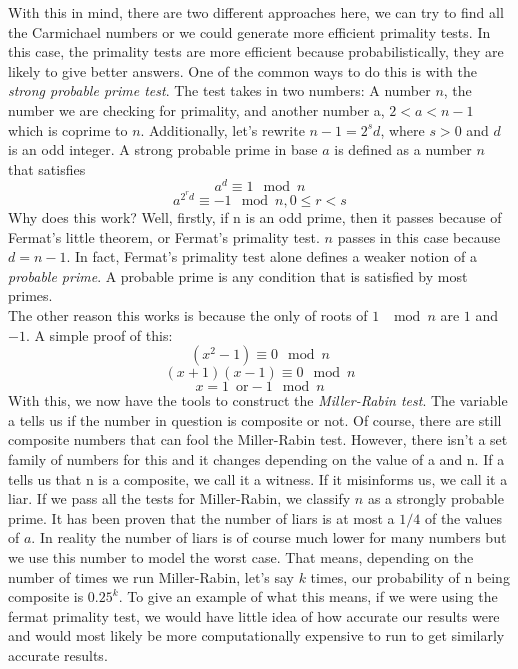 \documentclass[conference]{IEEEtran}
\begin{document}
With this in mind, there are two different approaches here, we can try to find all the Carmichael numbers or we could generate more efficient primality tests. In this case, the primality tests are more efficient because probabilistically, they are likely to give better answers. One of the common ways to do this is with the \textit{strong probable prime test}. The test takes in two numbers: A number $n$, the number we are checking for primality, and another number a, $2 < a < n - 1$ which is coprime to $n$. Additionally, let's rewrite $n - 1 = 2^s d$, where $s > 0$ and $d$ is an odd integer. A strong probable prime in base $a$ is defined as a number $n$ that satisfies 
\[
    a^d \equiv 1 \mod n
\]
\[
    a^{2^r d} \equiv -1 \mod n, 0 \leq r < s 
\]
Why does this work? Well, firstly, if n is an odd prime, then it passes because of Fermat's little theorem, or Fermat's primality test. $n$ passes in this case because $d = n - 1$. In fact, Fermat's primality test alone defines a weaker notion of a \textit{probable prime}. A probable prime is any condition that is satisfied by most primes. \\
The other reason this works is because the only of roots of $1$ $\mod n$ are $1$ and $-1$. A simple proof of this:
\[
    (x^2 - 1) \equiv 0 \mod n
\]
\[
    (x + 1)(x - 1) \equiv 0 \mod n
\]
\[
    x = 1\,\,\, \text{or} -1 \mod n
\]
With this, we now have the tools to construct the \textit{Miller-Rabin test}. The variable a tells us if the number in question is composite or not. Of course, there are still composite numbers that can fool the Miller-Rabin test. However, there isn't a set family of numbers for this and it changes depending on the value of a and n. If a tells us that n is a composite, we call it a witness. If it misinforms us, we call it a liar. If we pass all the tests for Miller-Rabin, we classify $n$ as a strongly probable prime. It has been proven that the number of liars is at most a \href{https://doi.org/10.1016%2F0022-314X%2880%2990084-0}{$1/4$} of the values of $a$. In reality the number of liars is of course much lower for many numbers but we use this number to model the worst case. That means, depending on the number of times we run Miller-Rabin, let's say $k$ times, our probability of n being composite is $0.25^k$. To give an example of what this means, if we were using the fermat primality test, we would have little idea of how accurate our results were and would most likely be more computationally expensive to run to get similarly accurate results.
\end{document}
